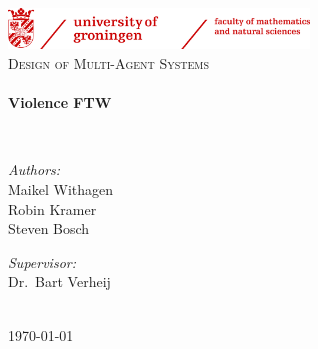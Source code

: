 \begin{titlepage}
  \begin{center}
    \includegraphics[width=0.6\textwidth]{images/logo}~\\[3cm]

    \textsc{\Large Design of Multi-Agent Systems}\\[0.5cm]

    \HRule \\[0.4cm]
    { \huge \bfseries Violence FTW\\[0.4cm] }

    \HRule \\[1.5cm]

    \noindent
    \begin{minipage}{0.4\textwidth}
      \begin{flushleft} \large
	\emph{Authors:}\\
	Maikel Withagen\\
	Robin Kramer\\
	Steven Bosch
      \end{flushleft}
    \end{minipage}%
    \begin{minipage}{0.4\textwidth}
      \begin{flushright} \large
	\emph{Supervisor:} \\
	  Dr.~Bart Verheij \\
	  \hspace{1 mm} \\
	  \hspace{1 mm}
      \end{flushright}
    \end{minipage}

    \vfill
    {\large \today}
  \end{center}
\end{titlepage}
